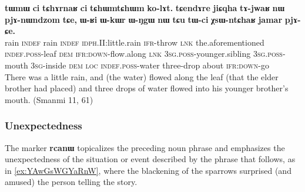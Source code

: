 \documentclass[oldfontcommands,oneside,a4paper,11pt]{article}
\newcommand{\ipa}[1]{\mbox{\phon\textbf{#1}}} %
\begin{document}
\begin{exe}
\ex \label{ex:jiCqha}
 \gll \ipa{tɯmɯ} 	\ipa{ci} 	\ipa{tɕhɤrnaʁ} 	\ipa{ci} 	\ipa{tɕhɯmtɕhɯm} 	\ipa{ko-lɤt.} 	\ipa{tɕendɤre} 	\ipa{jiɕqha} 	\ipa{tɤ-jwaʁ} 	\ipa{nɯ} 	\ipa{pjɤ-nɯndzom} 	\ipa{tɕe,} 	\ipa{ɯ-ʁi} 	\ipa{ɯ-kɯr} 	\ipa{ɯ-ŋgɯ} 	\ipa{nɯ} 	\ipa{tɕu} 	\ipa{tɯ-ci} 	\ipa{χsɯ-ntɕhaʁ} 	\ipa{jamar} 	\ipa{pjɤ-ɕe.} \\
 rain \textsc{indef}  rain \textsc{indef} \textsc{idph}.II:little.rain \textsc{ifr}-throw \textsc{lnk} the.aforementioned \textsc{indef.poss}-leaf \textsc{dem} \textsc{ifr:down}-flow.along \textsc{lnk} \textsc{3sg.poss}-younger.sibling  \textsc{3sg.poss}-mouth \textsc{3sg}-inside \textsc{dem} \textsc{loc} \textsc{indef.poss}-water three-drop about \textsc{ifr:down}-go \\
 \glt There was a little rain, and (the water) flowed along the leaf (that the elder brother had placed) and three drops of water flowed into his younger brother's mouth. (Smanmi 11, 61)
\end{exe}

 \subsubsection{Unexpectedness}
The marker \ipa{rcanɯ} topicalizes the preceding noun phrase and emphasizes the unexpectedness of the situation or event described by the phrase that follows, as in \ref{ex:YAwGsWGYaRnW}, where the blackening of the sparrows surprised (and amused) the person telling the story.

\end{document}
